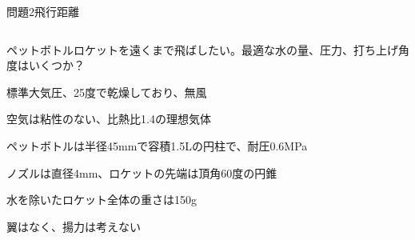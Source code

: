 \documentclass[dvipdfmx]{beamer}
\newenvironment{wideitemize}{\itemize\setlength{\itemsep}{1em}}{\enditemize}
\newenvironment{wideitemize2}{\itemize\setlength{\itemsep}{0.2em}}{\enditemize}
\begin{document}

\begin{frame}{問題2}{飛行距離}
\begin{columns}[t]
\begin{column}{0.7\textwidth}
\begin{wideitemize}
	\item ペットボトルロケットを遠くまで飛ばしたい。最適な水の量、圧力、打ち上げ角度はいくつか？
	\begin{wideitemize2}
		\item 標準大気圧、25度で乾燥しており、無風
		\item 空気は粘性のない、比熱比1.4の理想気体
		\item ペットボトルは半径45mmで容積1.5Lの円柱で、耐圧0.6MPa
		\item ノズルは直径4mm、ロケットの先端は頂角60度の円錐
		\item 水を除いたロケット全体の重さは150g
		\item 翼はなく、揚力は考えない
	\end{wideitemize2}
\end{wideitemize}


\end{column}
\end{columns}
\end{frame}
\end{document}
